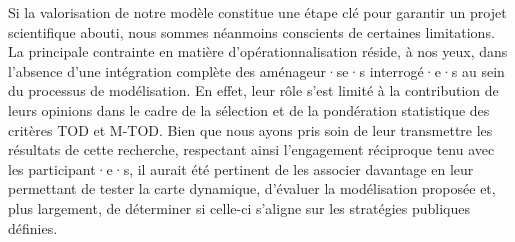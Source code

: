 \begin{refsegment}
Si la valorisation de notre modèle constitue une étape clé pour garantir un projet scientifique abouti, nous sommes néanmoins conscients de certaines limitations. La principale contrainte en matière d’opérationnalisation réside, à nos yeux, dans l’absence d’une intégration complète des aménageur·se·s interrogé·e·s au sein du processus de modélisation. En effet, leur rôle s’est limité à la contribution de leurs opinions dans le cadre de la sélection et de la pondération statistique des critères \acrshort{TOD} et \acrshort{M-TOD}. Bien que nous ayons pris soin de leur transmettre les résultats de cette recherche, respectant ainsi l’engagement réciproque tenu avec les participant·e·s, il aurait été pertinent de les associer davantage en leur permettant de tester la carte dynamique, d’évaluer la modélisation proposée et, plus largement, de déterminer si celle-ci s’aligne sur les stratégies publiques définies.%


\end{refsegment}

